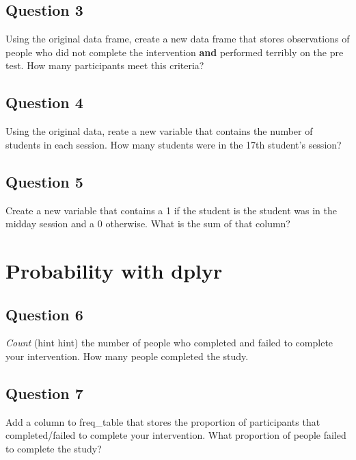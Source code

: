 \documentclass[]{book}
\theoremstyle{definition}
\theoremstyle{definition}
\theoremstyle{definition}
\theoremstyle{remark}
\begin{document}
\hypertarget{question-3}{%
\subsection{Question 3}\label{question-3}}

Using the original data frame, create a new data frame that stores observations of people who did not complete the intervention \textbf{and} performed terribly on the pre test. How many participants meet this criteria?

\hypertarget{question-4}{%
\subsection{Question 4}\label{question-4}}

Using the original data, reate a new variable that contains the number of students in each session. How many students were in the 17th student's session?

\hypertarget{question-5}{%
\subsection{Question 5}\label{question-5}}

Create a new variable that contains a 1 if the student is the student was in the midday session and a 0 otherwise. What is the sum of that column?

\hypertarget{probability-with-dplyr}{%
\section{Probability with dplyr}\label{probability-with-dplyr}}

\hypertarget{question-6}{%
\subsection{Question 6}\label{question-6}}

\emph{Count} (hint hint) the number of people who completed and failed to complete your intervention. How many people completed the study.

\hypertarget{question-7}{%
\subsection{Question 7}\label{question-7}}

Add a column to freq\_table that stores the proportion of participants that completed/failed to complete your intervention. What proportion of people failed to complete the study?
\end{document}
